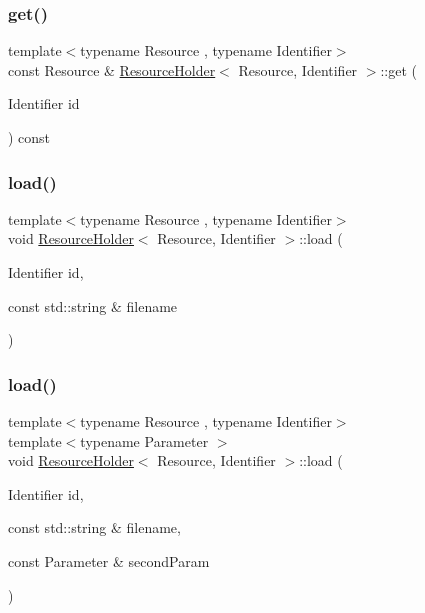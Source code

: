 \mbox{\label{class_resource_holder_aaf453199dbdfb9b8395c52b29eb915c2}} 
\subsubsection{\texorpdfstring{get()}{get()}\hspace{0.1cm}{\footnotesize\ttfamily [2/2]}}
{\footnotesize\ttfamily template$<$typename Resource , typename Identifier$>$ \\
const Resource \& \hyperlink{class_resource_holder}{Resource\+Holder}$<$ Resource, Identifier $>$\+::get (\begin{DoxyParamCaption}\item[{Identifier}]{id }\end{DoxyParamCaption}) const}

\mbox{\label{class_resource_holder_accb6a2b6bd2da503ddfd57b5c0028a16}} 
\subsubsection{\texorpdfstring{load()}{load()}\hspace{0.1cm}{\footnotesize\ttfamily [1/2]}}
{\footnotesize\ttfamily template$<$typename Resource , typename Identifier$>$ \\
void \hyperlink{class_resource_holder}{Resource\+Holder}$<$ Resource, Identifier $>$\+::load (\begin{DoxyParamCaption}\item[{Identifier}]{id,  }\item[{const std\+::string \&}]{filename }\end{DoxyParamCaption})}

\mbox{\label{class_resource_holder_ae83a7a88b2b2a74b6143796eb4452110}} 
\subsubsection{\texorpdfstring{load()}{load()}\hspace{0.1cm}{\footnotesize\ttfamily [2/2]}}
{\footnotesize\ttfamily template$<$typename Resource , typename Identifier$>$ \\
template$<$typename Parameter $>$ \\
void \hyperlink{class_resource_holder}{Resource\+Holder}$<$ Resource, Identifier $>$\+::load (\begin{DoxyParamCaption}\item[{Identifier}]{id,  }\item[{const std\+::string \&}]{filename,  }\item[{const Parameter \&}]{second\+Param }\end{DoxyParamCaption})}



